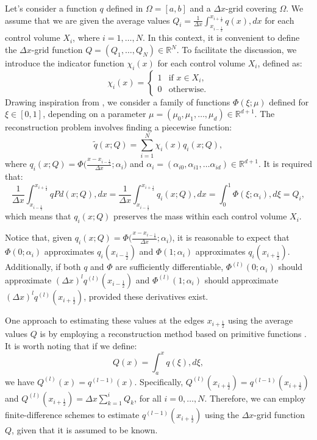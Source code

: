 Let's consider a function ${q}$ defined in $\Omega=[a,b]$ and a $\Delta x$-grid covering $\Omega$. 
We assume that we are given the average values ${Q}_i = \frac{1}{\Delta x} \int_{x_{i-\frac{1}{2}}}^{x_{i+\frac{1}{2}}} {q}(x) ,dx$ 
for each control volume $X_i$, where $i = 1, \ldots, N$. 
In this context, it is convenient to define the $\Delta x$-grid function $Q=(Q_1, \ldots, Q_N) \in \mathbb{R}^{N}$.
To facilitate the discussion, we introduce the indicator function $\chi_{i}(x)$ for each control volume $X_i$, defined as:
\begin{equation*}
	\label{chp2-sec3-1-eq1}
	\chi_{i}(x)=
	\begin{cases}
		1 & \text{if } x \in X_i,\\
		0 & \text{otherwise.}
	\end{cases}
\end{equation*}
Drawing inspiration from \citet[Chapter~1]{stoer:2002}, we consider a family of functions $\Phi(\xi;\mu)$ 
defined for $\xi \in [0,1]$, depending on a parameter $\mu =(\mu_0, \mu_1,\ldots, \mu_d)\in \mathbb{R}^{d+1}$.
The reconstruction problem involves finding a piecewise function:
\begin{equation}
	\label{chp2-sec3-1-eq2}
	\tilde{q}(x;Q) = \sum_{i=1}^{N} \chi_i(x) q_i(x;Q),
\end{equation}
where $q_i(x;Q) = \Phi\big(\frac{x-x_{i-\frac{1}{2}}}{\Delta x};\alpha_i\big)$ and 
$\alpha_i= (\alpha_{i0},\alpha_{i1}, \ldots \alpha_{id})\in\mathbb{R}^{d+1}$. It is required that:
\begin{equation*}
	\frac{1}{\Delta x}\int_{x_{i-\frac{1}{2}}}^{x_{i+\frac{1}{2}}} {q}{Pd}(x;Q) ,dx =
	\frac{1}{\Delta x}\int_{x_{i-\frac{1}{2}}}^{x_{i+\frac{1}{2}}} q_i(x;Q) ,dx =
	\int_{0}^{1} \Phi(\xi;\alpha_i) ,d\xi = {Q}_i,
\end{equation*}
which means that $q_i(x;Q)$ preserves the mass within each control volume $X_i$.

Notice that, given $q_i(x;Q) = \Phi\big(\frac{x-x_{i-\frac{1}{2}}}{\Delta x};\alpha_i\big)$, 
it is reasonable to expect that $\Phi(0;\alpha_i)$ approximates $q_i(x_{i-\frac{1}{2}})$ and
$\Phi(1;\alpha_i)$ approximates $q_i(x_{i+\frac{1}{2}})$. Additionally, if both $q$ and
$\Phi$ are sufficiently differentiable, $\Phi^{(l)}(0;\alpha_i)$ should approximate
$(\Delta x)^l q^{(l)}(x_{i-\frac{1}{2}})$ and $\Phi^{(l)}(1;\alpha_i)$ should
approximate $(\Delta x)^l q^{(l)}(x_{i+\frac{1}{2}})$, provided these derivatives exist.

One approach to estimating these values at the edges $x_{i+\frac{1}{2}}$ using the average 
values $Q$ is by employing a reconstruction method based on primitive functions \citep[Chapter~17]{leveque:2002}. 
It is worth noting that if we define:
\begin{equation}
	\label{chp2-sec-recon-ppm-eq5}
	Q(x) = \int_{a}^x q(\xi) ,d\xi,
\end{equation}
we have $Q^{(l)}(x) = q^{(l-1)}(x)$. 
Specifically, $Q^{(l)}(x_{i+\frac{1}{2}}) = q^{(l-1)}(x_{i+\frac{1}{2}})$ and 
$Q^{(l)}(x_{i+\frac{1}{2}}) = \Delta x\sum_{k=1}^i Q_k$, for all $i=0, \ldots, N$.
Therefore, we can employ finite-difference schemes to estimate $q^{(l-1)}(x_{i+\frac{1}{2}})$
using the $\Delta x$-grid function $Q$, given that it is assumed to be known.

